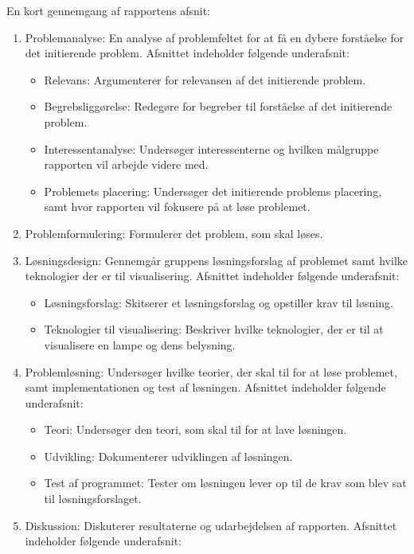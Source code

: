 En kort gennemgang af rapportens afsnit:
\begin{enumerate}
\item Problemanalyse: En analyse af problemfeltet for at få en dybere forståelse for det initierende problem. Afsnittet indeholder følgende underafsnit:
  \begin{itemize}
    \item Relevans: Argumenterer for relevansen af det initierende problem.
    \item Begrebsliggørelse: Redegøre for begreber til forståelse af det initierende problem.
    \item Interessentanalyse: Undersøger interessenterne og hvilken målgruppe rapporten vil arbejde videre med.
    \item Problemets placering: Undersøger det initierende problems placering, samt hvor rapporten vil fokusere på at løse problemet.
  \end{itemize}
\item Problemformulering: Formulerer det problem, som skal løses.
\item Løsningsdesign: Gennemgår gruppens løsningsforslag af problemet samt hvilke teknologier der er til visualisering. Afsnittet indeholder følgende underafsnit: 
  \begin{itemize}
    \item Løsningsforslag: Skitserer et løsningsforslag og opstiller krav til løsning.
    \item Teknologier til visualisering: Beskriver hvilke teknologier, der er til at visualisere en lampe og dens belysning.
  \end{itemize}
\item Problemløsning: Undersøger hvilke teorier, der skal til for at løse problemet, samt implementationen og test af løsningen. Afsnittet indeholder følgende underafsnit:
  \begin{itemize}
    \item Teori: Undersøger den teori, som skal til for at lave løsningen.
    \item Udvikling: Dokumenterer udviklingen af løsningen.
    \item Test af programmet: Tester om løsningen lever op til de krav som blev sat til løsningsforslaget.
  \end{itemize}
\item Diskussion: Diskuterer resultaterne og udarbejdelsen af rapporten. Afsnittet indeholder følgende underafsnit:
  \begin{itemize}

\end{itemize}
\end{enumerate}
